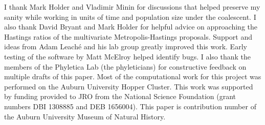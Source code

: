 I thank Mark Holder and Vladimir Minin for discussions that helped preserve my
sanity while working in units of time and population size under the coalescent.
I also thank David Bryant and Mark Holder for helpful advice on approaching the
Hastings ratios of the multivariate Metropolis-Hastings proposals.
Support and ideas from Adam Leach\'e and his lab group greatly improved this
work.
Early testing of the software by Matt McElroy helped identify bugs.
I also thank the members of the Phyletica Lab (the phyleticians) for
constructive feedback on multiple drafts of this paper.
Most of the computational work for this project was performed on the
Auburn University Hopper Cluster.
This work was supported by funding provided to JRO from the National Science
Foundation (grant numbers DBI 1308885 and DEB 1656004).
This paper is contribution number  of the Auburn University
Museum of Natural History.


